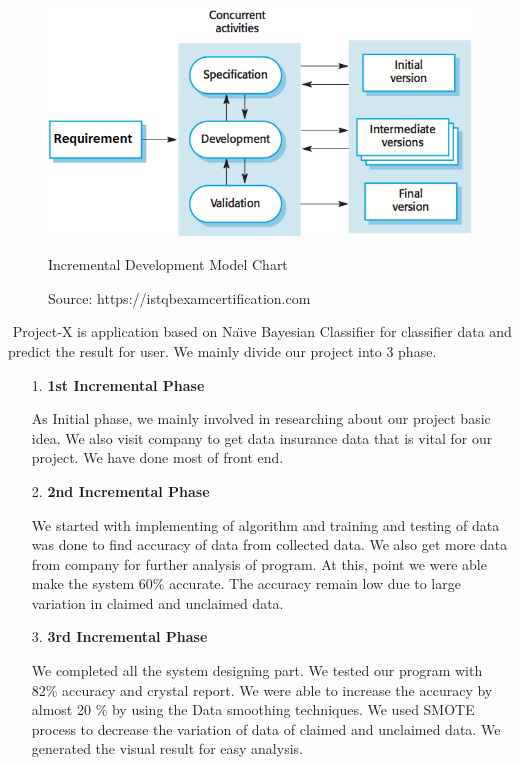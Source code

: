 \begin{figure}[tbh] %
\begin{center}
	\includegraphics[width = 5in]{images/sdlc.png}
	\caption{Incremental Development Model Chart} %
	\caption*{Source: https://istqbexamcertification.com}
	\label{Incremental Development Model Chart} %
\end{center}
\end{figure}
\par 
$  $
Project-X is application based on Na\"{\i}ve Bayesian Classifier for classifier data and predict the result for user.
We mainly divide our project into 3 phase.
\begin{enumerate}
	\item[1.] \textbf{1st Incremental Phase}
	\par
	As Initial phase, we mainly involved in researching about our project basic idea. We also visit company to get data insurance data that is vital for  our project. We have done most of front end. 
	 \item[2.] \textbf{2nd Incremental Phase}
	 \par 
	 We started with implementing of algorithm and training and testing of data was done to find accuracy of data from collected data. We also get more data from company for further analysis of program. At this, point we were able make the system 60\% accurate. The accuracy remain low due to large variation in claimed and unclaimed data.
	 \newpage
	 \item[3.] \textbf{3rd Incremental Phase}
	 \par 
	 We completed all the system designing part. We tested our program with 82\% accuracy and crystal report. We were able to increase the accuracy by almost 20 \% by using the Data smoothing techniques.
 We used SMOTE process to decrease the variation of data of claimed and unclaimed data. We generated the visual result for easy analysis.
 
\end{enumerate}







